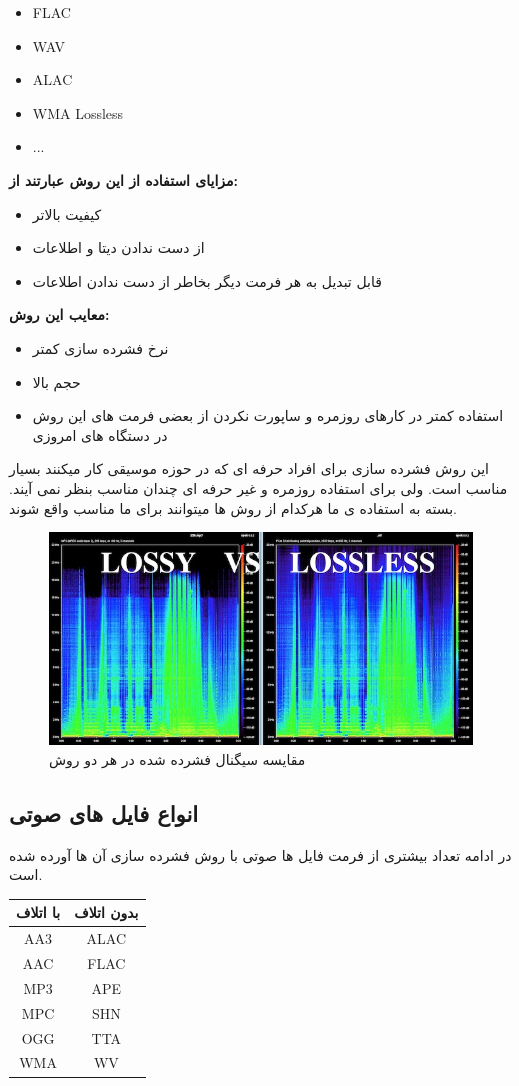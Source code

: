 \begin{itemize}
    \item    
    FLAC
    \item    
    WAV
    \item   
    ALAC
    \item
    WMA Lossless
    \item
    ...
\end{itemize}
\textbf{مزایای استفاده از این روش عبارتند از:}
\begin{itemize}
    \item    
    کیفیت بالاتر
    \item    
    از دست ندادن دیتا و اطلاعات
    \item   
    قابل تبدیل به هر فرمت دیگر بخاطر از دست ندادن اطلاعات
\end{itemize}
\textbf{معایب این روش:}
\begin{itemize}
    \item    
    نرخ فشرده سازی کمتر
    \item    
    حجم بالا
    \item   
    استفاده کمتر در کارهای روزمره و ساپورت نکردن از بعضی فرمت های این روش در دستگاه های امروزی
\end{itemize}

این روش فشرده سازی برای افراد حرفه ای که در حوزه موسیقی کار میکنند بسیار مناسب است.
ولی برای استفاده روزمره و غیر حرفه ای چندان مناسب بنظر نمی آیند.
بسته به استفاده ی ما هرکدام از روش ها میتوانند برای ما مناسب واقع شوند.
\\
\begin{figure}[H]
    \centering
    \includegraphics[width=0.5\linewidth]{images/loss-vs-less.jpg}
    \caption{مقایسه سیگنال فشرده شده در هر دو روش}
    \label{fig:mesal3}
\end{figure}
\subsection{انواع فایل های صوتی}
در ادامه تعداد بیشتری از فرمت فایل ها صوتی با روش فشرده سازی آن ها آورده شده است.
\begin{center}
 \begin{tabular}{||c c||} 
 \hline
 با اتلاف & بدون اتلاف \\ [0.5ex] 
 \hline
 \hline
 AA3 & ALAC \\ 
 \hline
 AAC & FLAC \\ 
 \hline
 MP3 & APE \\ 
 \hline
 MPC & SHN \\ 
 \hline
 OGG & TTA \\ 
 \hline
 WMA & WV \\ 
 \hline
\end{tabular}
\end{center}

